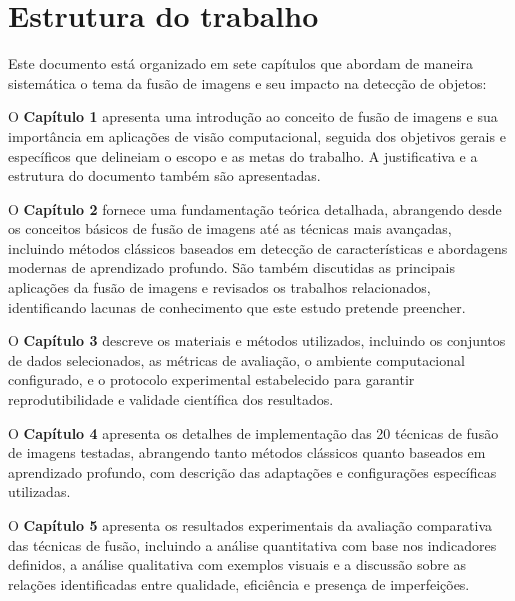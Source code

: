

\section{Estrutura do trabalho}\label{sec:estruturaTrabalho}

Este documento está organizado em sete capítulos que abordam de maneira sistemática o tema da fusão de imagens e seu impacto na detecção de objetos:

O \textbf{Capítulo 1} apresenta uma introdução ao conceito de fusão de imagens e sua importância em aplicações de visão computacional, seguida dos objetivos gerais e específicos que delineiam o escopo e as metas do trabalho. A justificativa e a estrutura do documento também são apresentadas.

O \textbf{Capítulo 2} fornece uma fundamentação teórica detalhada, abrangendo desde os conceitos básicos de fusão de imagens até as técnicas mais avançadas, incluindo métodos clássicos baseados em detecção de características e abordagens modernas de aprendizado profundo. São também discutidas as principais aplicações da fusão de imagens e revisados os trabalhos relacionados, identificando lacunas de conhecimento que este estudo pretende preencher.

O \textbf{Capítulo 3} descreve os materiais e métodos utilizados, incluindo os conjuntos de dados selecionados, as métricas de avaliação, o ambiente computacional configurado, e o protocolo experimental estabelecido para garantir reprodutibilidade e validade científica dos resultados.

O \textbf{Capítulo 4} apresenta os detalhes de implementação das 20 técnicas de fusão de imagens testadas, abrangendo tanto métodos clássicos quanto baseados em aprendizado profundo, com descrição das adaptações e configurações específicas utilizadas.

O \textbf{Capítulo 5} apresenta os resultados experimentais da avaliação comparativa das técnicas de fusão, incluindo a análise quantitativa com base nos indicadores definidos, a análise qualitativa com exemplos visuais e a discussão sobre as relações identificadas entre qualidade, eficiência e presença de imperfeições.


